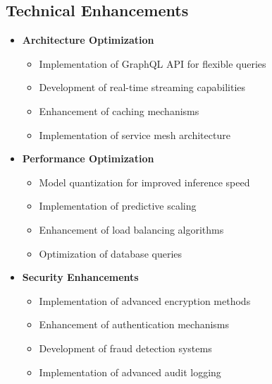 \documentclass[12pt,a4paper]{report}
\begin{document}
\subsection{Technical Enhancements}
\begin{itemize}
    \item \textbf{Architecture Optimization}
    \begin{itemize}
        \item Implementation of GraphQL API for flexible queries
        \item Development of real-time streaming capabilities
        \item Enhancement of caching mechanisms
        \item Implementation of service mesh architecture
    \end{itemize}

    \item \textbf{Performance Optimization}
    \begin{itemize}
        \item Model quantization for improved inference speed
        \item Implementation of predictive scaling
        \item Enhancement of load balancing algorithms
        \item Optimization of database queries
    \end{itemize}

    \item \textbf{Security Enhancements}
    \begin{itemize}
        \item Implementation of advanced encryption methods
        \item Enhancement of authentication mechanisms
        \item Development of fraud detection systems
        \item Implementation of advanced audit logging
    \end{itemize}
\end{itemize}
\end{document}

